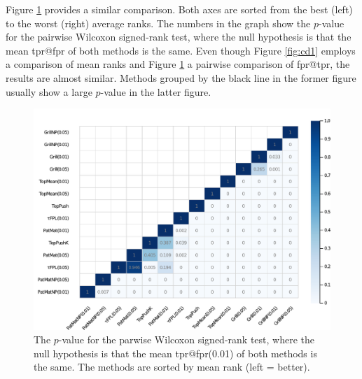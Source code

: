 Figure \ref{fig:wilcoxon} provides a similar comparison. Both axes are sorted from the best (left) to the worst (right) average ranks. The numbers in the graph show the $p$-value for the pairwise Wilcoxon signed-rank test, where the null hypothesis is that the mean tpr@fpr of both methods is the same. Even though Figure \ref{fig:cd1} employs a comparison of mean ranks and Figure \ref{fig:wilcoxon} a pairwise comparison of fpr@tpr, the results are almost similar. Methods grouped by the black line in the former figure usually show a large $p$-value in the latter figure.

\begin{figure}[!ht]
  \centering
  \includegraphics[width = \linewidth]{images/wilcoxon_fpr_1.pdf}
  \caption{The $p$-value for the parwise Wilcoxon signed-rank test, where the null hypothesis is that the mean tpr@fpr(0.01) of both methods is the same. The methods are sorted by mean rank (left = better).}
  \label{fig:wilcoxon}
\end{figure}

